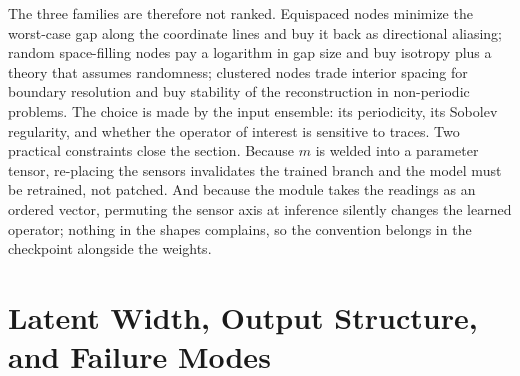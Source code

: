 The three families are therefore not ranked. Equispaced nodes minimize the worst-case gap along
the coordinate lines and buy it back as directional aliasing; random space-filling nodes pay a
logarithm in gap size and buy isotropy plus a theory that assumes randomness; clustered nodes
trade interior spacing for boundary resolution and buy stability of the reconstruction in
non-periodic problems. The choice is made by the input ensemble: its periodicity, its Sobolev
regularity, and whether the operator of interest is sensitive to traces. Two practical
constraints close the section. Because $m$ is welded into a parameter tensor, re-placing the
sensors invalidates the trained branch and the model must be retrained, not patched. And
because the module takes the readings as an ordered vector, permuting the sensor axis at
inference silently changes the learned operator; nothing in the shapes complains, so the
convention belongs in the checkpoint alongside the weights.

\section{Latent Width, Output Structure, and Failure Modes}
\label{sec:ch22-latent}

